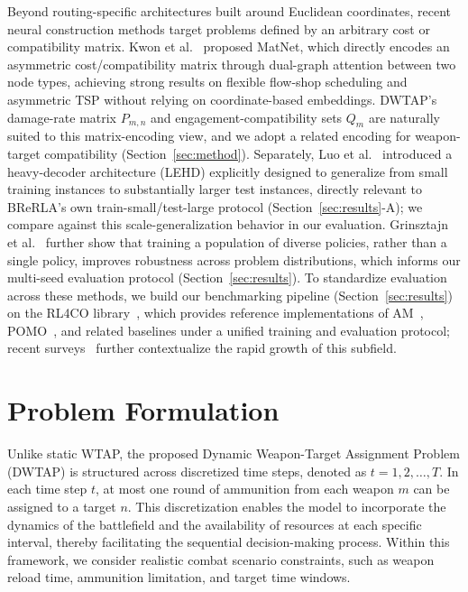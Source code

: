\documentclass{ieeeaccess}
\begin{document}
Beyond routing-specific architectures built around Euclidean coordinates, recent neural construction methods target problems defined by an arbitrary cost or compatibility matrix. Kwon et al.~\cite{kwon2021matrix} proposed MatNet, which directly encodes an asymmetric cost/compatibility matrix through dual-graph attention between two node types, achieving strong results on flexible flow-shop scheduling and asymmetric TSP without relying on coordinate-based embeddings. DWTAP's damage-rate matrix $P_{m,n}$ and engagement-compatibility sets $Q_m$ are naturally suited to this matrix-encoding view, and we adopt a related encoding for weapon-target compatibility (Section~\ref{sec:method}). Separately, Luo et al.~\cite{luo2023lehd} introduced a heavy-decoder architecture (LEHD) explicitly designed to generalize from small training instances to substantially larger test instances, directly relevant to BReRLA's own train-small/test-large protocol (Section~\ref{sec:results}-A); we compare against this scale-generalization behavior in our evaluation. Grinsztajn et al.~\cite{grinsztajn2023winner} further show that training a population of diverse policies, rather than a single policy, improves robustness across problem distributions, which informs our multi-seed evaluation protocol (Section~\ref{sec:results}). To standardize evaluation across these methods, we build our benchmarking pipeline (Section~\ref{sec:results}) on the RL4CO library~\cite{berto2023rl4co}, which provides reference implementations of AM~\cite{kool2018attention}, POMO~\cite{kwon2020pomo}, and related baselines under a unified training and evaluation protocol; recent surveys~\cite{mazyavkina2021reinforcement,bogyrbayeva2024survey} further contextualize the rapid growth of this subfield.

\section{Problem Formulation}
\label{sec:problem}

Unlike static WTAP, the proposed Dynamic Weapon-Target Assignment Problem (DWTAP) is structured across discretized time steps, denoted as $t = 1, 2, \ldots, T$. In each time step $t$, at most one round of ammunition from each weapon $m$ can be assigned to a target $n$. This discretization enables the model to incorporate the dynamics of the battlefield and the availability of resources at each specific interval, thereby facilitating the sequential decision-making process. Within this framework, we consider realistic combat scenario constraints, such as weapon reload time, ammunition limitation, and target time windows.
\end{document}
